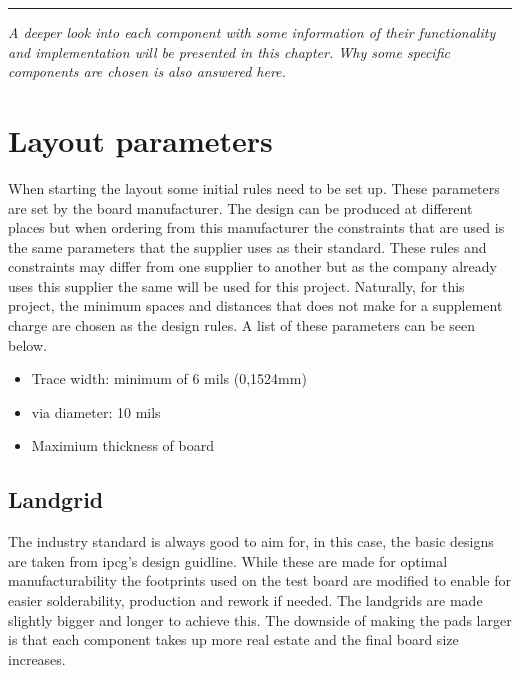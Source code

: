 
\vspace{-10ex}%
\rule{\textwidth}{0.3pt}
\vspace{5ex}

\textit{
A deeper look into each component with some information of their functionality and implementation will be presented in this chapter. Why some specific components are chosen is also answered here. 
}
\vspace{5ex}


\section{Layout parameters}

When starting the layout some initial rules need to be set up. These parameters are set by the board manufacturer.
The design can be produced at different places but when ordering from this manufacturer the constraints that are used is the same parameters that the supplier uses as their standard.
These rules and constraints may differ from one supplier to another but as the company already uses this supplier the same will be used for this project.
Naturally, for this project, the minimum spaces and distances that does not make for a supplement charge are chosen as the design rules. A list of these parameters can be seen below.

\begin{itemize}
\item Trace width: minimum of 6 mils (0,1524mm) 
\item \gls{via} diameter: 10 mils
\item Maximium thickness of board

\end{itemize}
 
\subsection{Landgrid}
The industry standard is always good to aim for, in this case, the basic designs are taken from \gls{ipcg}'s design guidline\cite{ipcg}. While these are made for optimal manufacturability the footprints used on the test board are modified to enable for easier solderability, production and rework if needed. The landgrids are made slightly bigger and longer to achieve this. The downside of making the pads larger is that each component takes up more real estate and the final board size increases.

